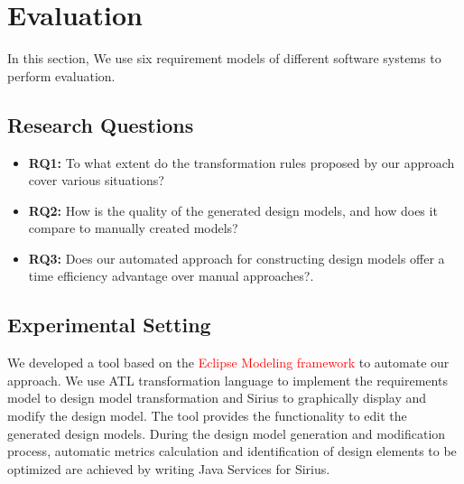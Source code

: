 \documentclass[pdflatex,sn-mathphys-num]{sn-jnl}%
\theoremstyle{thmstyleone}%
\theoremstyle{thmstyletwo}%
\theoremstyle{thmstylethree}%
\begin{document}
\section{Evaluation}
In this section, We use six requirement models of different software systems to perform evaluation.
\subsection{Research Questions}
\begin{itemize}
    \item \textbf{RQ1:} To what extent do the transformation rules proposed by our approach cover various situations?
    \item \textbf{RQ2:} How is the quality of the generated design models, and how does it compare to manually created models?
    \item \textbf{RQ3:} Does our automated approach for constructing design models offer a time efficiency advantage over manual approaches?.
\end{itemize}
\subsection{Experimental Setting}
We developed a tool based on the \textcolor{red}{Eclipse Modeling framework} to automate our approach. We use ATL transformation language to implement the requirements model to design model transformation and Sirius to graphically display and modify the design model. The tool provides the functionality to edit the generated design models. During the design model generation and modification process, automatic metrics calculation and identification of design elements to be optimized are achieved by writing Java Services for Sirius.
\end{document}
